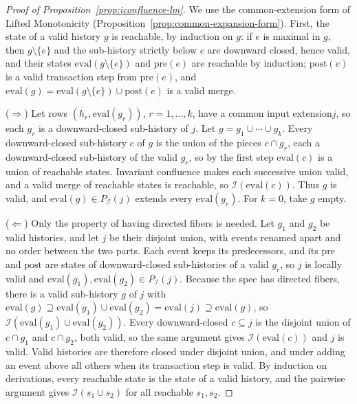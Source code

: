 \documentclass[sigconf]{cidr-2027}
\theoremstyle{remark}
\newcommand{\indesc}{input extension\xspace} %
\newcommand{\outrel}{extends\xspace}          %
\begin{document}
\begin{proof}[Proof of Proposition~\ref{prop:iconfluence-lm}]
We use the common-extension form of Lifted Monotonicity
(Proposition~\ref{prop:common-expansion-form}).  First, the
state of a valid history $g$ is reachable, by induction on $g$: if $e$ is
maximal in $g$, then $g\setminus\{e\}$ and the sub-history strictly below $e$
are downward closed, hence valid, and their states $\mathrm{eval}(g\setminus\{e\})$
and $\mathrm{pre}(e)$ are reachable by induction; $\mathrm{post}(e)$ is a valid
transaction step from $\mathrm{pre}(e)$, and
$\mathrm{eval}(g)=\mathrm{eval}(g\setminus\{e\})\cup\mathrm{post}(e)$ is a
valid merge.

($\Rightarrow$) Let rows $(h_r,\mathrm{eval}(g_r))$, $r=1,\ldots,k$, have a
common \indesc $j$, so each $g_r$ is a downward-closed sub-history of $j$.  Let
$g=g_1\cup\cdots\cup g_k$.  Every downward-closed sub-history $c$ of $g$ is the
union of the pieces $c\cap g_r$, each a downward-closed sub-history of the valid
$g_r$, so by the first step $\mathrm{eval}(c)$ is a union of reachable states.  Invariant
confluence makes each successive union valid, and a valid merge of reachable
states is reachable, so $\mathcal I(\mathrm{eval}(c))$.  Thus $g$ is valid, and
$\mathrm{eval}(g)\in P_{\mathcal I}(j)$ \outrel every $\mathrm{eval}(g_r)$.
For $k=0$, take $g$ empty.

($\Leftarrow$) Only the property of having directed fibers is needed.  Let $g_1$ and $g_2$ be valid
histories, and let $j$ be their disjoint union, with events renamed apart and
no order between the two parts.  Each event keeps its predecessors, and its
$\mathrm{pre}$ and $\mathrm{post}$ are states of downward-closed sub-histories
of a valid $g_r$, so $j$ is locally valid and $\mathrm{eval}(g_1),\mathrm{eval}(g_2)\in P_{\mathcal I}(j)$.
Because the spec has directed fibers, there is a valid sub-history $g$ of $j$ with
$\mathrm{eval}(g)\supseteq\mathrm{eval}(g_1)\cup\mathrm{eval}(g_2)=\mathrm{eval}(j)\supseteq\mathrm{eval}(g)$,
so $\mathcal I(\mathrm{eval}(g_1)\cup\mathrm{eval}(g_2))$.  Every
downward-closed $c\subseteq j$ is the disjoint union of $c\cap g_1$ and $c\cap
g_2$, both valid, so the same argument gives $\mathcal I(\mathrm{eval}(c))$ and
$j$ is valid.  Valid histories
are therefore closed under disjoint union, and under adding an event above all
others when its transaction step is valid.  By induction on derivations, every
reachable state is the state of a valid history, and the pairwise argument
gives $\mathcal I(s_1\cup s_2)$ for all reachable $s_1,s_2$.
\end{proof}
\end{document}
